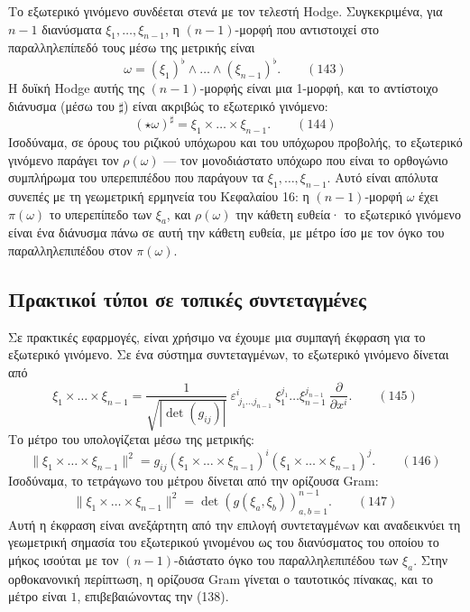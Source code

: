 \documentclass[12pt]{article}
\begin{document}
Το εξωτερικό γινόμενο συνδέεται στενά με τον τελεστή Hodge. Συγκεκριμένα, για $n-1$ διανύσματα $\xi_1, \dots, \xi_{n-1}$, η $(n-1)$-μορφή που αντιστοιχεί στο παραλληλεπίπεδό τους μέσω της μετρικής είναι
\begin{equation}
\omega = (\xi_1)^\flat \wedge \dots \wedge (\xi_{n-1})^\flat. \qquad (143)
\end{equation}
Η δυϊκή Hodge αυτής της $(n-1)$-μορφής είναι μια 1-μορφή, και το αντίστοιχο διάνυσμα (μέσω του $\sharp$) είναι ακριβώς το εξωτερικό γινόμενο:
\begin{equation}
(\star \omega)^\sharp = \xi_1 \times \dots \times \xi_{n-1}. \qquad (144)
\end{equation}
Ισοδύναμα, σε όρους του ριζικού υπόχωρου και του υπόχωρου προβολής, το εξωτερικό γινόμενο παράγει τον $\rho(\omega)$ — τον μονοδιάστατο υπόχωρο που είναι το ορθογώνιο συμπλήρωμα του υπερεπιπέδου που παράγουν τα $\xi_1, \dots, \xi_{n-1}$. Αυτό είναι απόλυτα συνεπές με τη γεωμετρική ερμηνεία του Κεφαλαίου 16: η $(n-1)$-μορφή $\omega$ έχει $\pi(\omega)$ το υπερεπίπεδο των $\xi_a$, και $\rho(\omega)$ την κάθετη ευθεία· το εξωτερικό γινόμενο είναι ένα διάνυσμα πάνω σε αυτή την κάθετη ευθεία, με μέτρο ίσο με τον όγκο του παραλληλεπιπέδου στον $\pi(\omega)$.

\subsection{Πρακτικοί τύποι σε τοπικές συντεταγμένες}

Σε πρακτικές εφαρμογές, είναι χρήσιμο να έχουμε μια συμπαγή έκφραση για το εξωτερικό γινόμενο. Σε ένα σύστημα συντεταγμένων, το εξωτερικό γινόμενο δίνεται από
\begin{equation}
\xi_1 \times \dots \times \xi_{n-1} = \frac{1}{\sqrt{|\det(g_{ij})|}} \ \varepsilon^{i}_{\ j_1 \dots j_{n-1}} \ \xi_1^{j_1} \dots \xi_{n-1}^{j_{n-1}} \ \frac{\partial}{\partial x^i}. \qquad (145)
\end{equation}
Το μέτρο του υπολογίζεται μέσω της μετρικής:
\begin{equation}
\|\xi_1 \times \dots \times \xi_{n-1}\|^2 = g_{ij} (\xi_1 \times \dots \times \xi_{n-1})^i (\xi_1 \times \dots \times \xi_{n-1})^j. \qquad (146)
\end{equation}
Ισοδύναμα, το τετράγωνο του μέτρου δίνεται από την ορίζουσα Gram:
\begin{equation}
\|\xi_1 \times \dots \times \xi_{n-1}\|^2 = \det \left( g(\xi_a, \xi_b) \right)_{a,b=1}^{n-1}. \qquad (147)
\end{equation}
Αυτή η έκφραση είναι ανεξάρτητη από την επιλογή συντεταγμένων και αναδεικνύει τη γεωμετρική σημασία του εξωτερικού γινομένου ως του διανύσματος του οποίου το μήκος ισούται με τον $(n-1)$-διάστατο όγκο του παραλληλεπιπέδου των $\xi_a$. Στην ορθοκανονική περίπτωση, η ορίζουσα Gram γίνεται ο ταυτοτικός πίνακας, και το μέτρο είναι $1$, επιβεβαιώνοντας την (138).
\end{document}
